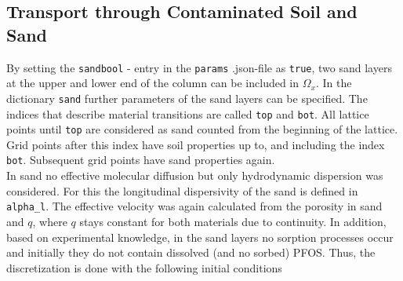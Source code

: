 \subsection{Transport through Contaminated Soil and Sand}
By setting the \texttt{sandbool} - entry in the \texttt{params} .json-file as \texttt{true}, two sand layers at the upper and lower end of the column can be included in $\Omega_x$. In the dictionary \texttt{sand} further parameters of the sand layers can be specified. The indices that describe material transitions are called \texttt{top} and \texttt{bot}. All lattice points until \texttt{top} are considered as sand counted from the beginning of the lattice. Grid points after this index have soil properties up to, and including the index \texttt{bot}. Subsequent grid points have sand properties again.\\
In sand no effective molecular diffusion but only hydrodynamic dispersion was considered. For this the longitudinal dispersivity of the sand is defined in \texttt{alpha\_l}. The effective velocity was again calculated from the porosity in sand and $q$, where $q$ stays constant for both materials due to continuity. In addition, based on experimental knowledge, in the sand layers no sorption processes occur and initially they do not contain dissolved (and no sorbed) PFOS. Thus, the discretization is done with the following initial conditions
